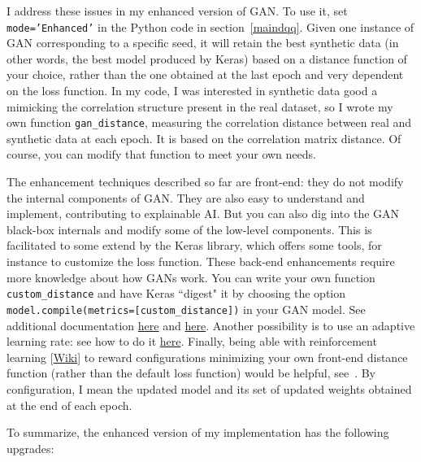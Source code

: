 \documentclass[oneside,10pt]{book}
\begin{document}
I address these issues in my enhanced version of GAN. To use it, set \texttt{mode='Enhanced'} in the Python code
 in section~\ref{maindqq}. Given one instance of GAN corresponding to a specific seed, it will retain the best synthetic data (in other words, the best model produced by Keras) based on
 a distance function of your choice, rather than the one obtained at the last epoch and very dependent on the loss function. In my code, I was interested in synthetic data good a mimicking the correlation structure present in the real dataset, so I wrote my own function
\texttt{gan\_distance}, measuring the correlation distance between real and synthetic data at each epoch. It is based on
 the \textcolor{index}{correlation matrix distance}. Of course, you can modify that function to meet your own needs.

The enhancement techniques described so far are front-end: they do not modify the internal components of GAN. They are also easy to understand and implement, contributing to
 explainable AI. But you can also dig into the GAN black-box internals and modify some of the low-level components. This is facilitated to some extend by the Keras library, which offers some tools, for instance to customize the loss function. These back-end enhancements require more knowledge about how GANs work. You can write your own
 function \texttt{custom\_distance} and have Keras ``digest" it by choosing the
 option \texttt{model.compile(metrics=[custom\_distance])} in your GAN model. See additional documentation
 \href{https://www.tensorflow.org/guide/keras/save_and_serialize}{here} and
\href{https://datascience.stackexchange.com/questions/116811/define-a-custom-distance-between-classes-in-keras}{here}.
Another possibility is to use an adaptive \textcolor{index}{learning rate}: see how to do it \href{https://towardsdatascience.com/learning-rate-schedule-in-practice-an-example-with-keras-and-tensorflow-2-0-2f48b2888a0c}{here}.
Finally, being able  with
\textcolor{index}{reinforcement learning} [\href{https://en.wikipedia.org/wiki/Reinforcement_learning}{Wiki}] to reward configurations minimizing your own front-end distance function (rather than the
 default loss function) would be helpful, see~\cite{reinflr21}. By configuration, I mean the updated model and its set of
updated weights obtained at the end of each epoch.


\noindent To summarize, the enhanced version of my implementation has the following upgrades: \vspace{1ex}
\end{document}
